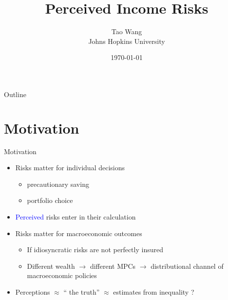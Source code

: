 \documentclass{beamer}
\title{Perceived Income Risks}
\author{Tao Wang \\ Johns Hopkins University}
\date{\today}
\begin{document}
	

\begin{frame}
	\titlepage
\end{frame}
\begin{frame}{Outline}
	\tableofcontents
\end{frame}


\section{Motivation}

\begin{frame}{Motivation}
	\begin{itemize}
		\item Risks matter for individual decisions
		\begin{itemize}
			\item precautionary saving
			\item portfolio choice 
		\end{itemize} 
	    \item \textcolor{blue}{Perceived} risks enter in their calculation 
		\item Risks matter for macroeconomic outcomes
		\begin{itemize}
			\item If idiosyncratic risks are not perfectly insured 
			\item Different wealth $\rightarrow$ different MPCs $\rightarrow$ distributional channel of macroeconomic policies 
		\end{itemize}  %
		\item Perceptions $\approx$ `` the truth'' $\approx$  estimates from inequality  ? %
	\end{itemize}
\end{frame}
\end{document}
